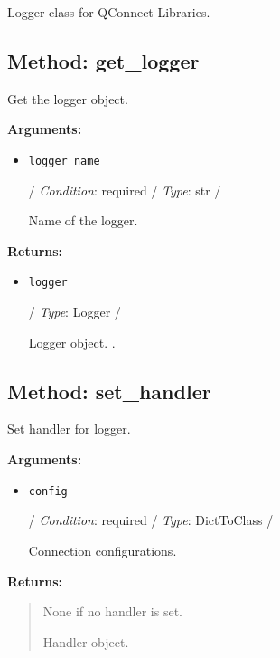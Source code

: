 Logger class for QConnect Libraries.

\hypertarget{qconnectbase-qlogger-method-get_logger-54}{%
\subsection{Method: get\_logger}\label{qconnectbase-qlogger-method-get_logger-54}}

Get the logger object.

\textbf{Arguments:}

\begin{itemize}
\item
  \texttt{logger\_name}

  / \emph{Condition}: required / \emph{Type}: str /

  Name of the logger.
\end{itemize}

\textbf{Returns:}

\begin{itemize}
\item
  \texttt{logger}

  / \emph{Type}: Logger /

  Logger object. .
\end{itemize}

\hypertarget{qconnectbase-qlogger-method-set_handler-55}{%
\subsection{Method: set\_handler}\label{qconnectbase-qlogger-method-set_handler-55}}

Set handler for logger.

\textbf{Arguments:}

\begin{itemize}
\item
  \texttt{config}

  / \emph{Condition}: required / \emph{Type}: DictToClass /

  Connection configurations.
\end{itemize}

\textbf{Returns:}

\begin{quote}
None if no handler is set.

Handler object.
\end{quote}

